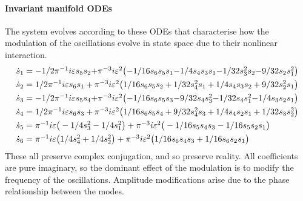 \paragraph{Invariant manifold ODEs} 
The system evolves according to these ODEs that characterise how the modulation of the oscillations evolve in state space due to their nonlinear interaction.
\begin{align*}&
\dot s_{1}=\ParMath{ -1/2 \pi ^{-1} i \eps s_{5} s_{2}+\pi ^{-3} i \eps^{2} \big(-
1/16 s_{6} s_{5} s_{1}-1/4 s_{4} s_{3} s_{1}-1/32 s_{3}^{2} s_{2}-9/32 s
_{2} s_{1}^{2}\big)
}\\&
\dot s_{2}=\ParMath{ 1/2 \pi ^{-1} i \eps s_{6} s_{1}+\pi ^{-3} i \eps^{2} \big(1/
16 s_{6} s_{5} s_{2}+1/32 s_{4}^{2} s_{1}+1/4 s_{4} s_{3} s_{2}+9/32 s_{
2}^{2} s_{1}\big)
}\\&
\dot s_{3}=\ParMath{ -1/2 \pi ^{-1} i \eps s_{5} s_{4}+\pi ^{-3} i \eps^{2} \big(-
1/16 s_{6} s_{5} s_{3}-9/32 s_{4} s_{3}^{2}-1/32 s_{4} s_{1}^{2}-1/4 s_{
3} s_{2} s_{1}\big)
}\\&
\dot s_{4}=\ParMath{ 1/2 \pi ^{-1} i \eps s_{6} s_{3}+\pi ^{-3} i \eps^{2} \big(1/
16 s_{6} s_{5} s_{4}+9/32 s_{4}^{2} s_{3}+1/4 s_{4} s_{2} s_{1}+1/32 s_{
3} s_{2}^{2}\big)
}\\&
\dot s_{5}=\ParMath{ \pi ^{-1} i \eps \big(-1/4 s_{3}^{2}-1/4 s_{1}^{2}\big)+\pi 
^{-3} i \eps^{2} \big(-1/16 s_{5} s_{4} s_{3}-1/16 s_{5} s_{2} s_{1}
\big)
}\\&
\dot s_{6}=\ParMath{ \pi ^{-1} i \eps \big(1/4 s_{4}^{2}+1/4 s_{2}^{2}\big)+\pi ^{
-3} i \eps^{2} \big(1/16 s_{6} s_{4} s_{3}+1/16 s_{6} s_{2} s_{1}\big)
}
\end{align*}
These all preserve complex conjugation, and so preserve reality.  All coefficients are pure imaginary, so the dominant effect of the modulation is to modify the frequency of the oscillations.  Amplitude modifications arise due to the phase relationship between the modes.

